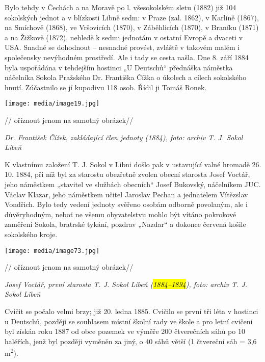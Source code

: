 Bylo tehdy v Čechách a na Moravě po l. všesokolském sletu (1882) již 104
sokolských jednot a v blízkosti Libně sedm: v Praze (zal. 1862), v
Karlíně (1867), na Smíchově (1868), ve Vršovicích (1870), v Záběhlicích
(1870), v Braníku (1871) a na Žižkově (1872), nehledě k sedmi jednotám v
ostatní Evropě a dvaceti v USA. Snadné se dohodnout -- nesnadné provést,
zvláště v takovém malém i společensky nevýhodném prostředí. Ale i tady
se cesta našla. Dne 8. září 1884 byla uspořádána v tehdejším hostinci „U
Deutschů`` přednáška náměstka náčelníka Sokola Pražského Dr. Františka
Čížka o úkolech a cílech sokolského hnutí. Zúčastnilo se jí kupodivu 118
osob. Řídil ji Tomáš Ronek.

\texttt{[image: media/image19.jpg]}

// oříznout jenom na samotný obrázek//

\emph{Dr. František Čížek, zakládající člen jednoty (1884), foto: archiv
T. J. Sokol Libeň}

K vlastnímu založení T. J. Sokol v Libni došlo pak v ustavující valné
hromadě 26. 10. 1884, při níž byl za starostu obezřetně zvolen obecní
starosta Josef Voctář, jeho náměstkem „stavitel ve službách obecních``
Josef Bukovský, náčelníkem JUC. Václav Klazar, jeho náměstkem učitel
Jaroslav Pechan a jednatelem Vítězslav Vondřich. Bylo tedy vedení
jednoty svěřeno osobám odborně povolaným, ale i důvěryhodným, neboť ne
všemu obyvatelstvu mohlo být vítáno pokrokové zaměření Sokola, bratrské
tykání, pozdrav „Nazdar`` a dokonce červená košile sokolského kroje.

\texttt{[image: media/image73.jpg]}

// oříznout jenom na samotný obrázek//

\emph{Josef Voctář, první starosta T. J. Sokol Libeň (\hl{1884--⁠⁠⁠⁠⁠⁠1894}),
foto: archiv T. J. Sokol Libeň}

Cvičit se počalo velmi brzy; již 20. ledna 1885. Cvičilo se první tři
léta v hostinci u Deutschů, později se souhlasem místní školní rady ve
škole a pro letní cvičení byl získán roku 1887 od obce pozemek ve výměře
200 čtverečních sáhů po 10 haléřích, jenž byl později vyměněn za jiný, o
40 sáhů větší (1 čtvereční sáh = 3,6 m\textsuperscript{2}).


